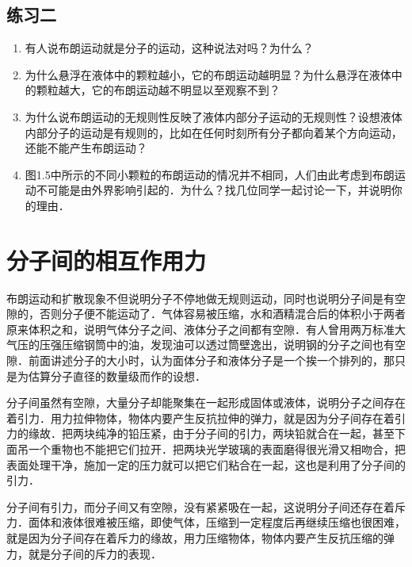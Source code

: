 \subsection*{练习二}
\begin{enumerate}
\item 有人说布朗运动就是分子的运动，这种说法对吗？为什么？
\item 为什么悬浮在液体中的颗粒越小，它的布朗运动越明显？为什么悬浮在液体中的颗粒越大，它的布朗运动越不明显以至观察不到？
\item 为什么说布朗运动的无规则性反映了液体内部分子运动的无规则性？设想液体内部分子的运动是有规则的，比如在任何时刻所有分子都向着某个方向运动，还能不能产生布朗运动？
\item  图1.5中所示的不同小颗粒的布朗运动的情况并不相同，人们由此考虑到布朗运动不可能是由外界影响引起的．为什么？找几位同学一起讨论一下，并说明你的理由．
\end{enumerate}

\section{分子间的相互作用力}
布朗运动和扩散现象不但说明分子不停地做无规则运动，同时也说明分子间是有空隙的，否则分子便不能运动了．气体容易被压缩，水和酒精混合后的体积小于两者原来体积之和，说明气体分子之间、液体分子之间都有空隙．有人曾用两万标准大气压的压强压缩钢筒中的油，发现油可以透过筒壁逸出，说明钢的分子之间也有空隙．前面讲述分子的大小时，认为面体分子和液体分子是一个挨一个排列的，那只是为估算分子直径的数量级而作的设想．

分子间虽然有空隙，大量分子却能聚集在一起形成固体或液体，说明分子之间存在着引力．用力拉伸物体，物体内要产生反抗拉伸的弹力，就是因为分子间存在着引力的缘故．把两块纯净的铅压紧，由于分子间的引力，两块铅就合在一起，甚至下面吊一个重物也不能把它们拉开．把两块光学玻璃的表面磨得很光滑又相吻合，把表面处理干净，施加一定的压力就可以把它们粘合在一起，这也是利用了分子间的引力．

分子间有引力，而分子间又有空隙，没有紧紧吸在一起，这说明分子间还存在着斥力．面体和液体很难被压缩，即使气体，压缩到一定程度后再继续压缩也很困难，就是因为分子间存在着斥力的缘故，用力压缩物体，物体内要产生反抗压缩的弹力，就是分子间的斥力的表现．

